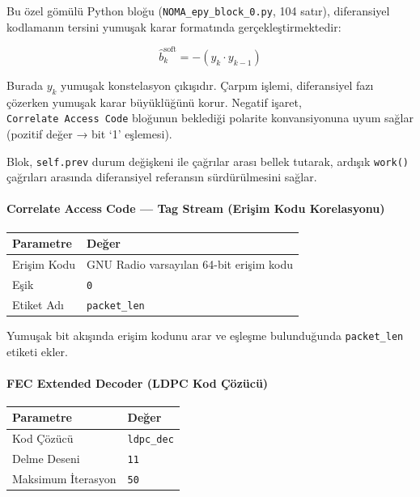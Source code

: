 \documentclass[
]{IEEEtran}
\newcounter{none} %
\begin{document}
Bu özel gömülü Python bloğu (\texttt{NOMA\_epy\_block\_0.py}, 104
satır), diferansiyel kodlamanın tersini yumuşak karar formatında
gerçekleştirmektedir:

\[\hat{b}_k^{\text{soft}} = -(y_k \cdot y_{k-1})\]

Burada \(y_k\) yumuşak konstelasyon çıkışıdır. Çarpım işlemi,
diferansiyel fazı çözerken yumuşak karar büyüklüğünü korur. Negatif
işaret, \texttt{Correlate\ Access\ Code} bloğunun beklediği polarite
konvansiyonuna uyum sağlar (pozitif değer → bit `1' eşlemesi).

Blok, \texttt{self.prev} durum değişkeni ile çağrılar arası bellek
tutarak, ardışık \texttt{work()} çağrıları arasında diferansiyel
referansın sürdürülmesini sağlar.

\paragraph{Correlate Access Code --- Tag Stream (Erişim Kodu
Korelasyonu)}\label{correlate-access-code-tag-stream-eriux15fim-kodu-korelasyonu}

{\def\LTcaptype{none} %
\begin{longtable}[]{@{}ll@{}}
\toprule\noalign{}
Parametre & Değer \\
\midrule\noalign{}
\endhead
\bottomrule\noalign{}
\endlastfoot
Erişim Kodu & GNU Radio varsayılan 64-bit erişim kodu \\
Eşik & \texttt{0} \\
Etiket Adı & \texttt{packet\_len} \\
\end{longtable}
}

Yumuşak bit akışında erişim kodunu arar ve eşleşme bulunduğunda
\texttt{packet\_len} etiketi ekler.

\paragraph{FEC Extended Decoder (LDPC Kod
Çözücü)}\label{fec-extended-decoder-ldpc-kod-uxe7uxf6zuxfccuxfc}

{\def\LTcaptype{none} %
\begin{longtable}[]{@{}ll@{}}
\toprule\noalign{}
Parametre & Değer \\
\midrule\noalign{}
\endhead
\bottomrule\noalign{}
\endlastfoot
Kod Çözücü & \texttt{ldpc\_dec} \\
Delme Deseni & \texttt{\textquotesingle{}11\textquotesingle{}} \\
Maksimum İterasyon & \texttt{50} \\
\end{longtable}
}
\end{document}
